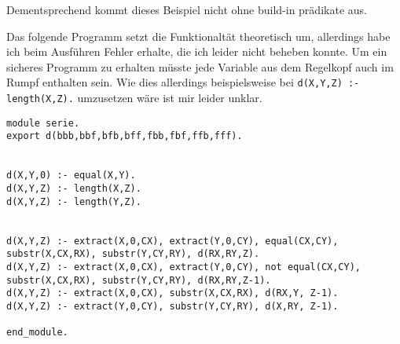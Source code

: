 \documentclass[12pt,a4paper]{amsart}
\begin{document}
Dementsprechend kommt dieses Beispiel nicht ohne build-in prädikate aus.

\newpage
\begin{aufgabe1}
\end{aufgabe1}


Das folgende Programm setzt die Funktionaltät theoretisch um, allerdings habe ich beim Ausführen Fehler erhalte, die ich leider nicht beheben konnte. Um ein sicheres Programm zu erhalten müsste jede Variable aus dem Regelkopf auch im Rumpf enthalten sein. Wie dies allerdings beispielsweise bei \texttt{d(X,Y,Z) :- length(X,Z).} umzusetzen wäre ist mir leider unklar.

\begin{lstlisting}
module serie.
export d(bbb,bbf,bfb,bff,fbb,fbf,ffb,fff).


d(X,Y,0) :- equal(X,Y).
d(X,Y,Z) :- length(X,Z).
d(X,Y,Z) :- length(Y,Z).


d(X,Y,Z) :- extract(X,0,CX), extract(Y,0,CY), equal(CX,CY), substr(X,CX,RX), substr(Y,CY,RY), d(RX,RY,Z).
d(X,Y,Z) :- extract(X,0,CX), extract(Y,0,CY), not equal(CX,CY), substr(X,CX,RX), substr(Y,CY,RY), d(RX,RY,Z-1).
d(X,Y,Z) :- extract(X,0,CX), substr(X,CX,RX), d(RX,Y, Z-1).
d(X,Y,Z) :- extract(Y,0,CY), substr(Y,CY,RY), d(X,RY, Z-1).

end_module.
\end{lstlisting}
\end{document}
